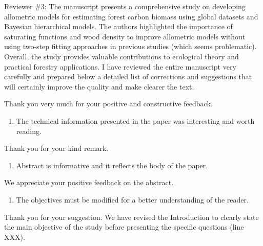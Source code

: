 \documentclass[
  12pt,
  letterpaper,
  DIV=11,
  numbers=noendperiod]{scrartcl}
\providecommand{\tightlist}{%
  \setlength{\itemsep}{0pt}\setlength{\parskip}{0pt}}\usepackage{longtable,booktabs,array}
\renewenvironment{quote}
  {\begin{customblockquote}\color{blockquote-text}\ignorespaces}
  {\end{customblockquote}}
\begin{document}
\begin{quote}
Reviewer \#3: The manuscript presents a comprehensive study on
developing allometric models for estimating forest carbon biomass using
global datasets and Bayesian hierarchical models. The authors
highlighted the importance of saturating functions and wood density to
improve allometric models without using two-step fitting approaches in
previous studies (which seems problematic). Overall, the study provides
valuable contributions to ecological theory and practical forestry
applications. I have reviewed the entire manuscript very carefully and
prepared below a detailed list of corrections and suggestions that will
certainly improve the quality and make clearer the text.
\end{quote}

Thank you very much for your positive and constructive feedback.

\begin{quote}
\begin{enumerate}
\def\labelenumi{\arabic{enumi})}
\tightlist
\item
  The technical information presented in the paper was interesting and
  worth reading.
\end{enumerate}
\end{quote}

Thank you for your kind remark.

\begin{quote}
\begin{enumerate}
\def\labelenumi{\arabic{enumi})}
\setcounter{enumi}{1}
\tightlist
\item
  Abstract is informative and it reflects the body of the paper.
\end{enumerate}
\end{quote}

We appreciate your positive feedback on the abstract.

\begin{quote}
\begin{enumerate}
\def\labelenumi{\arabic{enumi})}
\setcounter{enumi}{2}
\tightlist
\item
  The objectives must be modified for a better understanding of the
  reader.
\end{enumerate}
\end{quote}

Thank you for your suggestion. We have revised the Introduction to
clearly state the main objective of the study before presenting the
specific questions (line XXX).
\end{document}
